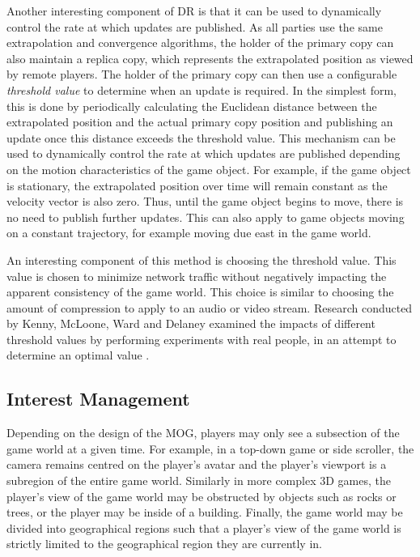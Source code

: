 Another interesting component of DR is that it can be used to dynamically control the rate at which updates are published. As all parties use the same extrapolation and convergence algorithms, the holder of the primary copy can also maintain a replica copy, which represents the extrapolated position as viewed by remote players. The holder of the primary copy can then use a configurable \textit{threshold value}  to determine when an update is required. In the simplest form, this is done by periodically calculating the Euclidean distance between the extrapolated position and the actual primary copy position and publishing an update once this distance exceeds the threshold value. This mechanism can be used to dynamically control the rate at which updates are published depending on the motion characteristics of the game object. For example, if the game object is stationary, the extrapolated position over time will remain constant as the velocity vector is also zero. Thus, until the game object begins to move, there is no need to publish further updates. This can also apply to game objects moving on a constant trajectory, for example moving due east in the game world. 

An interesting component of this method is choosing the threshold value. This value is chosen to minimize network traffic without negatively impacting the apparent consistency of the game world. This choice is similar to choosing the amount of compression to apply to an audio or video stream. Research conducted by Kenny, McLoone, Ward and Delaney examined the impacts of different threshold values by performing experiments with real people, in an attempt to determine an optimal value \cite{dead-reckonining-threshold-learning}. 



\subsection{Interest Management}\label{sec:interest-management}
Depending on the design of the MOG, players may only see a subsection of the game world at a given time. For example, in a top-down game or side scroller, the camera remains centred on the player's avatar and the player's viewport is a subregion of the entire game world. Similarly in more complex 3D games, the player's view of the game world may be obstructed by objects such as rocks or trees, or the player may be inside of a building. Finally, the game world may be divided into geographical regions such that a player's view of the game world is strictly limited to the geographical region they are currently in.

